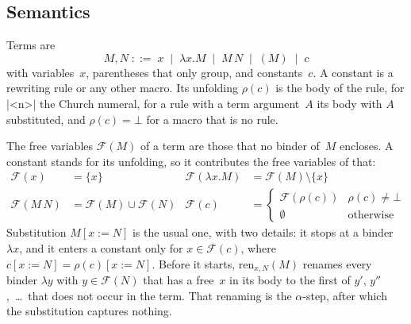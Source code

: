 \documentclass[parskip=half,english,numbers=noenddot,footnotes=nomultiple,oneside]{scrartcl}
\begin{document}
\subsection{Semantics}\label{sec:semantics}
Terms are
\[ M, N \;::=\; x \;\mid\; \lambda x.M \;\mid\; M\,N \;\mid\; (M) \;\mid\; c \]
with variables~\(x\), parentheses that only group, and constants~\(c\). A constant is a rewriting rule or any other macro. Its unfolding \(\rho(c)\) is the body of the rule, for |\num{<n>}| the Church numeral, for a rule with a term argument~\(A\) its body with \(A\) substituted, and \(\rho(c) = \bot\) for a macro that is no rule.

The free variables \(\mathcal{F}(M)\) of a term are those that no binder of~\(M\) encloses. A constant stands for its unfolding, so it contributes the free variables of that:
\begin{align*}
   \mathcal{F}(x) &= \{x\} &
   \mathcal{F}(\lambda x.M) &= \mathcal{F}(M) \setminus \{x\} \\
   \mathcal{F}(M\,N) &= \mathcal{F}(M) \cup \mathcal{F}(N) &
   \mathcal{F}(c) &= \begin{cases} \mathcal{F}(\rho(c)) & \rho(c) \neq \bot \\ \emptyset & \text{otherwise} \end{cases}
\end{align*}
Substitution \(M[x:=N]\) is the usual one, with two details: it stops at a binder \(\lambda x\), and it enters a constant only for \(x \in \mathcal{F}(c)\), where \(c[x:=N] = \rho(c)[x:=N]\). Before it starts, \(\mathrm{ren}_{x,N}(M)\) renames every binder \(\lambda y\) with \(y \in \mathcal{F}(N)\) that has a free~\(x\) in its body to the first of \(y'\), \(y''\),~\dots\ that does not occur in the term. That renaming is the \(\alpha\)-step, after which the substitution captures nothing.
\end{document}
